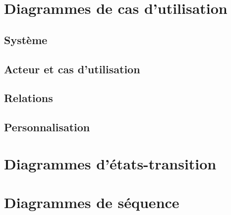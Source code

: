 \documentclass[a4paper,11pt]{report}
\begin{document}
\chapter{Diagrammes de cas d'utilisation}

\section{Système}

\section{Acteur et cas d'utilisation}

\section{Relations}

\section{Personnalisation}

\chapter{Diagrammes d'états-transition}

\chapter{Diagrammes de séquence}
\end{document}
